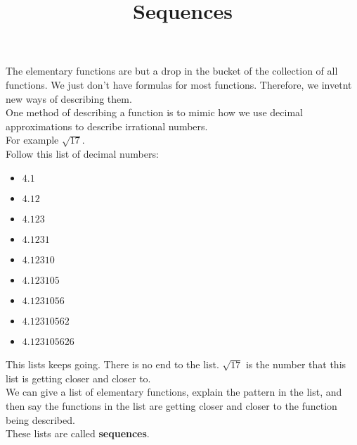 \documentclass{ximera}
\title{Sequences}
\begin{document}
\begin{abstract}
\end{abstract}

\maketitle





The elementary functions are but a drop in the bucket of the collection of all functions.  We just don't have formulas for most functions.  Therefore, we invetnt new ways of describing them. \\


One method of describing a function is to mimic how we use decimal approximations to describe irrational numbers. \\


For example $\sqrt{17}$. \\

Follow this list of decimal numbers:


\begin{itemize}
\item $4.1$
\item $4.12$
\item $4.123$
\item $4.1231$
\item $4.12310$
\item $4.123105$
\item $4.1231056$
\item $4.12310562$
\item $4.123105$626
\end{itemize}


This lists keeps going.  There is no end to the list.  $\sqrt{17}$ is the number that this list is getting closer and closer to. \\



We can give a list of elementary functions, explain the pattern in the list, and then say the functions in the list are getting closer and closer to the function being described. \\

These lists are called \textbf{sequences}. \\
\end{document}
